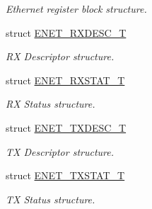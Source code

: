 \begin{DoxyCompactItemize}
\begin{DoxyCompactList}\small\item\em Ethernet register block structure. \end{DoxyCompactList}\item 
struct \hyperlink{structENET__RXDESC__T}{E\-N\-E\-T\-\_\-\-R\-X\-D\-E\-S\-C\-\_\-\-T}
\begin{DoxyCompactList}\small\item\em R\-X Descriptor structure. \end{DoxyCompactList}\item 
struct \hyperlink{structENET__RXSTAT__T}{E\-N\-E\-T\-\_\-\-R\-X\-S\-T\-A\-T\-\_\-\-T}
\begin{DoxyCompactList}\small\item\em R\-X Status structure. \end{DoxyCompactList}\item 
struct \hyperlink{structENET__TXDESC__T}{E\-N\-E\-T\-\_\-\-T\-X\-D\-E\-S\-C\-\_\-\-T}
\begin{DoxyCompactList}\small\item\em T\-X Descriptor structure. \end{DoxyCompactList}\item 
struct \hyperlink{structENET__TXSTAT__T}{E\-N\-E\-T\-\_\-\-T\-X\-S\-T\-A\-T\-\_\-\-T}
\begin{DoxyCompactList}\small\item\em T\-X Status structure. \end{DoxyCompactList}\end{DoxyCompactItemize}
